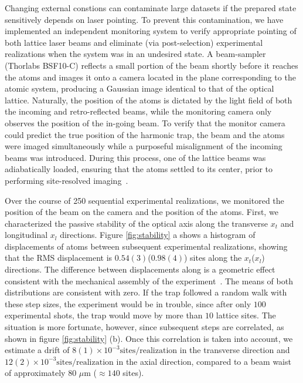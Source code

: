 \documentclass[twocolumn,aps,pra,showpacs,preprintnumbers,bibnotes]{revtex4-1}
\begin{document}
Changing external constions can contaminate large datasets if the prepared state sensitively depends on laser pointing. 
To prevent this contamination, we have implemented an independent monitoring system to verify appropriate pointing of both lattice laser beams and eliminate (via post-selection) experimental realizations when the system was in an undesired state.
A beam-sampler (Thorlabs BSF10-C) reflects a small portion of the beam shortly before it reaches the atoms and images it onto a camera located in the plane corresponding to the atomic system, producing a Gaussian image identical to that of the optical lattice.
Naturally, the position of the atoms is dictated by the light field of both the incoming and retro-reflected beams, while the monitoring camera only observes the position of the in-going beam.
To verify that the monitor camera could predict the true position of the harmonic trap, the beam and the atoms were imaged simultaneously while a purposeful misalignment of the incoming beams was introduced.
During this process, one of the lattice beams was adiabatically loaded, ensuring that the atoms settled to its center, prior to performing site-resolved imaging~\cite{Parsons2015}.

Over the course of 250 sequential experimental realizations, we monitored the position of the beam on the camera and the position of the atoms. 
First, we characterized the passive stability of the optical axis along the transverse $x_t$ and longitudinal $x_l$ directions. 
Figure \ref{fig:stability} a shows a histogram of displacements of atoms between subsequent experimental realizations, showing that the RMS displacement is $0.54(3)$($0.98(4)$) sites along the $x_t$($x_l$) directions.
The difference between displacements along is a geometric effect consistent with the mechanical assembly of the experiment~\cite{Huber2014}.
The means of both distributions are consistent with zero.
If the trap followed a random walk with these step sizes, the experiment would be in trouble, since after only $100$ experimental shots, the trap would move by more than $10$ lattice sites.
The situation is more fortunate, however, since subsequent steps are correlated, as shown in figure \ref{fig:stability} (b).
Once this correlation is taken into account, we estimate a drift of $8(1)\times 10^{-3}\mathrm{sites}/\mathrm{realization}$ in the transverse direction and $12(2)\times 10^{-3}\mathrm{sites}/\mathrm{realization}$ in the axial direction, compared to a beam waist of approximately $80$ $\mu$m ($\approx 140$ sites).
\end{document}
